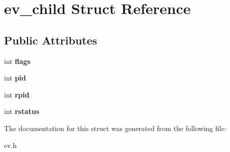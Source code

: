 \hypertarget{structev__child}{}\section{ev\+\_\+child Struct Reference}
\label{structev__child}
\subsection*{Public Attributes}
\begin{DoxyCompactItemize}
\item 
\hypertarget{structev__child_adc0be0861d839044ff2791879d23b9da}{}\label{structev__child_adc0be0861d839044ff2791879d23b9da} 
int {\bfseries flags}
\item 
\hypertarget{structev__child_aabe34b18e3fd1e6ad14a24e5c0e5ba13}{}\label{structev__child_aabe34b18e3fd1e6ad14a24e5c0e5ba13} 
int {\bfseries pid}
\item 
\hypertarget{structev__child_affe3dced46abf3638cf24b576c07c955}{}\label{structev__child_affe3dced46abf3638cf24b576c07c955} 
int {\bfseries rpid}
\item 
\hypertarget{structev__child_aac9c76006b1e0139dabae9a13775e775}{}\label{structev__child_aac9c76006b1e0139dabae9a13775e775} 
int {\bfseries rstatus}
\end{DoxyCompactItemize}


The documentation for this struct was generated from the following file\+:\begin{DoxyCompactItemize}
\item 
ev.\+h\end{DoxyCompactItemize}
